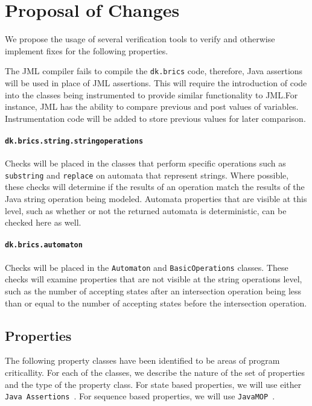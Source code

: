 \documentclass[letterpaper,11pt,twocolumn]{article}
\begin{document}
\section{Proposal of Changes}

We propose the usage of several verification tools to verify and otherwise
implement fixes for the following properties.

The JML compiler fails to compile the \texttt{dk.brics} code, therefore, Java
assertions will be used in place of JML assertions.  This will require the
introduction of code into the classes being instrumented to provide similar
functionality to JML.\@ For instance, JML has the ability to compare previous
and post values of variables.  Instrumentation code will be added to store
previous values for later comparison.

\paragraph{\texttt{dk.brics.string.stringoperations}} Checks will be placed in
the classes that perform specific operations such as \texttt{substring} and
\texttt{replace} on automata that represent strings.  Where possible, these
checks will determine if the results of an operation match the results of the
Java string operation being modeled.  Automata properties that are visible at
this level, such as whether or not the returned automata is deterministic, can
be checked here as well.

\paragraph{\texttt{dk.brics.automaton}} Checks will be placed in the
\texttt{Automaton} and \texttt{BasicOperations} classes.  These checks will
examine properties that are not visible at the string operations level, such as
the number of accepting states after an intersection operation being less than
or equal to the number of accepting states before the intersection operation.

\subsection{Properties}

The following property classes have been identified to be areas of program
criticallity.  For each of the classes, we describe the nature of the set of
properties and the type of the property class.  For state based properties, we
will use either \texttt{Java Assertions}~\cite{oracle-java-assertions}. For
sequence based properties, we will use \texttt{JavaMOP}~\cite{javamop}.
\end{document}
